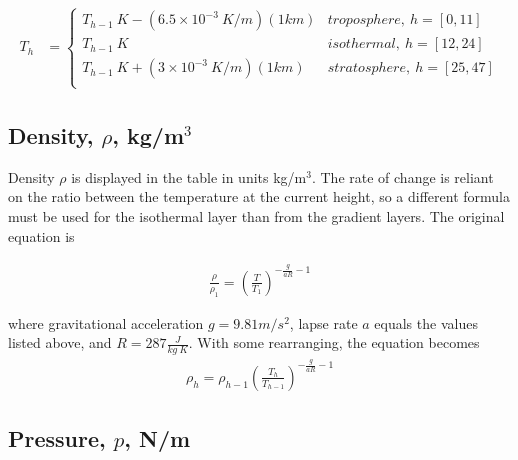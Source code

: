 \documentclass{article}
\begin{document}
\begin{align}
    T_h &= \begin{cases}
    T_{h-1}\ K - (6.5\times10^{-3}\  K/m)(1km)    & troposphere,\ h = [0,11] \\
    T_{h-1} \ K                                          & isothermal,\ h = [12,24] \\
    T_{h-1}\ K + (3\times10^{-3}\ K/m)(1km)       & stratosphere,\ h = [25,47] \\
    \end{cases}
\end{align}

\subsection{Density, $\rho$, kg/m$^3$}
Density $\rho$ is displayed in the table in units kg/m$^3$. The rate of change is reliant on the ratio between the temperature at the current height, so a different formula must be used for the isothermal layer than from the gradient layers. The original equation is 

\begin{align*}
    \frac{\rho}{\rho_1} = {\left(\frac{T}{T_1}\right)}^{-\frac{g}{aR}-1}
\end{align*}

where gravitational acceleration $g = 9.81m/s^2$, lapse rate $a$ equals the values listed above, and $R = 287 \frac{J}{kg\ K}$. With some rearranging, the equation becomes 
\begin{align*}
    \rho_h = \rho_{h-1}{\left(\frac{T_h}{T_{h-1}}\right)}^{-\frac{g}{aR}-1}
\end{align*}

\subsection{Pressure, $p$, N/m}
\end{document}
